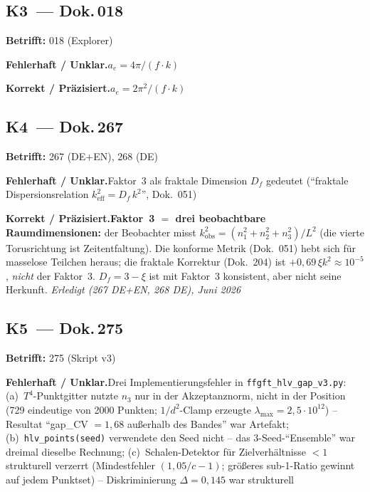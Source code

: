 \medskip


\subsection*{K3~--- Dok.\,018}

\noindent\textbf{Betrifft:} 018 (Explorer)


\smallskip\noindent\textbf{Fehlerhaft / Unklar.}\quad $a_e = 4\pi/(f \cdot k)$


\smallskip\noindent\textbf{Korrekt / Präzisiert.}\quad $a_e = 2\pi^2/(f \cdot k)$


\medskip


\subsection*{K4~--- Dok.\,267}

\noindent\textbf{Betrifft:} 267 (DE+EN), 268 (DE)


\smallskip\noindent\textbf{Fehlerhaft / Unklar.}\quad Faktor~3 als fraktale Dimension $D_f$ gedeutet (\enquote{fraktale Dispersionsrelation $k^2_\mathrm{eff}=D_f\,k^2$}, Dok.~051)


\smallskip\noindent\textbf{Korrekt / Präzisiert.}\quad \textbf{Faktor~3 $=$ drei beobachtbare Raumdimensionen:} der Beobachter misst $k_\mathrm{obs}^2=(n_1^2+n_2^2+n_3^2)/L^2$ (die vierte Torusrichtung ist Zeitentfaltung). Die konforme Metrik (Dok.~051) hebt sich für masselose Teilchen heraus; die fraktale Korrektur (Dok.~204) ist $+0{,}69\,\xi k^2\approx10^{-5}$, \emph{nicht} der Faktor~3. $D_f=3-\xi$ ist mit Faktor~3 konsistent, aber nicht seine Herkunft. \emph{Erledigt (267 DE+EN, 268 DE), Juni 2026}


\medskip


\subsection*{K5~--- Dok.\,275}

\noindent\textbf{Betrifft:} 275 (Skript v3)


\smallskip\noindent\textbf{Fehlerhaft / Unklar.}\quad Drei Implementierungsfehler in \texttt{ffgft\_hlv\_gap\_v3.py}:
  (a)~$T^4$-Punktgitter nutzte $n_3$ nur in der Akzeptanznorm, nicht in
  der Position (729 eindeutige von 2000 Punkten; $1/d^2$-Clamp erzeugte
  $\lambda_\mathrm{max}=2{,}5{\cdot}10^{12}$) -- Resultat
  \enquote{gap\_CV $=1{,}68$ außerhalb des Bandes} war Artefakt;
  (b)~\texttt{hlv\_points(seed)} verwendete den Seed nicht -- das
  3-Seed-\enquote{Ensemble} war dreimal dieselbe Rechnung;
  (c)~Schalen-Detektor für Zielverhältnisse $<1$ strukturell verzerrt
  (Mindestfehler $(1{,}05/c-1)$; größeres sub-1-Ratio gewinnt auf jedem
  Punktset) -- Diskriminierung $\Delta=0{,}145$ war strukturell


